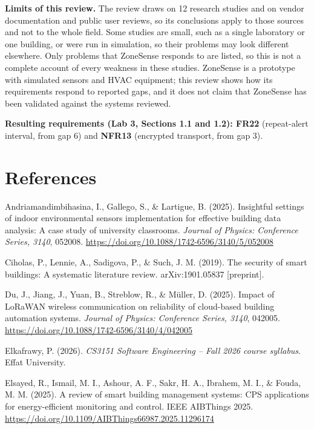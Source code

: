 \documentclass[11pt,a4paper]{article}
\begin{document}
\textbf{Limits of this review.} The review draws on 12 research studies and on vendor documentation and public user reviews, so its conclusions apply to those sources and not to the whole field. Some studies are small, such as a single laboratory or one building, or were run in simulation, so their problems may look different elsewhere. Only problems that ZoneSense responds to are listed, so this is not a complete account of every weakness in these studies. ZoneSense is a prototype with simulated sensors and HVAC equipment; this review shows how its requirements respond to reported gaps, and it does not claim that ZoneSense has been validated against the systems reviewed.

\begin{zcallout}
\textbf{Resulting requirements (Lab 3, Sections 1.1 and 1.2): FR22} (repeat-alert interval, from gap 6) and \textbf{NFR13} (encrypted transport, from gap 3).
\end{zcallout}

\clearpage
\section*{References}
\begingroup\small
\setlength{\parindent}{-1.5em}\setlength{\leftskip}{1.5em}\setlength{\parskip}{5pt}\raggedright

Andriamandimbihasina, I., Gallego, S., \& Lartigue, B. (2025). Insightful settings of indoor environmental sensors implementation for effective building data analysis: A case study of university classrooms. \textit{Journal of Physics: Conference Series, 3140}, 052008. \url{https://doi.org/10.1088/1742-6596/3140/5/052008}

Ciholas, P., Lennie, A., Sadigova, P., \& Such, J. M. (2019). The security of smart buildings: A systematic literature review. arXiv:1901.05837 [preprint].

Du, J., Jiang, J., Yuan, B., Streblow, R., \& M\"uller, D. (2025). Impact of LoRaWAN wireless communication on reliability of cloud-based building automation systems. \textit{Journal of Physics: Conference Series, 3140}, 042005. \url{https://doi.org/10.1088/1742-6596/3140/4/042005}

Elkafrawy, P. (2026). \textit{CS3151 Software Engineering -- Fall 2026 course syllabus}. Effat University.

Elsayed, R., Ismail, M. I., Ashour, A. F., Sakr, H. A., Ibrahem, M. I., \& Fouda, M. M. (2025). A review of smart building management systems: CPS applications for energy-efficient monitoring and control. IEEE AIBThings 2025. \url{https://doi.org/10.1109/AIBThings66987.2025.11296174}
\end{document}
